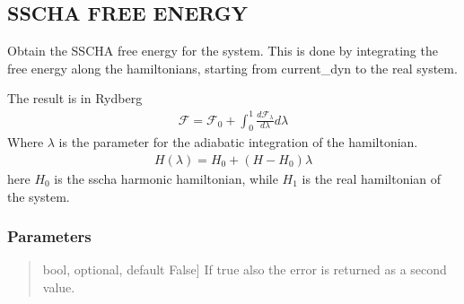 \documentclass[a4paper,11pt,english]{sphinxmanual}
\begin{document}
\begin{fulllineitems}
\begin{fulllineitems}
\begin{description}
\begin{quote}
\begin{description}
\end{description}
\end{quote}

\end{description}

\end{fulllineitems}


\begin{fulllineitems}
\label{\detokenize{apireference:sscha.Ensemble.Ensemble.get_free_energy}}
\pysigstartsignatures
{}
\pysigstopsignatures

\subsection{SSCHA FREE ENERGY}
\label{\detokenize{apireference:sscha-free-energy}}
\sphinxAtStartPar
Obtain the SSCHA free energy for the system.
This is done by integrating the free energy along the hamiltonians, starting
from current\_dyn to the real system.

\sphinxAtStartPar
The result is in Rydberg
\begin{equation*}
\begin{split}\mathcal F = \mathcal F_0 + \int_0^1 \frac{d\mathcal F_\lambda}{d\lambda} d\lambda\end{split}
\end{equation*}
\sphinxAtStartPar
Where \(\lambda\) is the parameter for the adiabatic integration of the hamiltonian.
\begin{equation*}
\begin{split}H(\lambda) = H_0 + (H - H_0) \lambda\end{split}
\end{equation*}
\sphinxAtStartPar
here \(H_0\) is the sscha harmonic hamiltonian, while \(H_1\) is the real hamiltonian
of the system.


\subsubsection{Parameters}
\label{\detokenize{apireference:id7}}\begin{quote}
\begin{description}
\sphinxlineitem{return\_error}{[}bool, optional, default False{]}
\sphinxAtStartPar
If true also the error is returned as a second value.


\end{description}
\end{quote}
\end{fulllineitems}
\end{fulllineitems}
\end{document}
